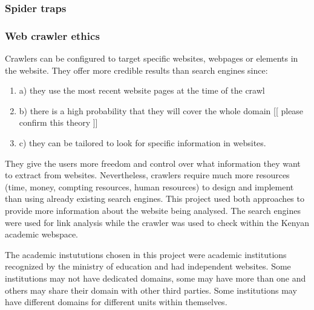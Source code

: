 \subsubsection{Spider traps}
\subsubsection{Web crawler ethics}
\noindent
Crawlers can be configured to target specific websites, webpages or elements in the website. They offer more credible results than search engines since:
\begin{enumerate}
\item a) they use the most recent website pages at the time of the crawl
\item b) there is a high probability that they will cover the whole domain [[ please confirm this theory ]]
\item c) they can be tailored to look for specific information in websites.
\end{enumerate}
\noindent
They give the users more freedom and control over what information they want to extract from
websites. Nevertheless, crawlers require much more resources (time, money, compting resources,
human resources) to design and implement than using already existing search engines.
This project used both approaches to provide more information about the website being analysed.
The search engines were used for link analysis while the crawler was used to check within the
Kenyan academic webspace.

\noindent
The academic instututions chosen in this project were academic institutions recognized by the
ministry of education and had independent websites. Some institutions may not have dedicated
domains, some may have more than one and others may share their domain with other third
parties. Some institutions may have different domains for different units within themselves.

